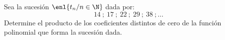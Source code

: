 Sea la sucesión $ \enl{t_n / n\in \N} $ dada por:
\[ 14\ ;\ 17\ ;\ 22\ ;\ 29\ ;\ 38\ ; \ldots \]
Determine el producto de los coeficientes distintos de cero de la función polinomial que forma la sucesión dada.
